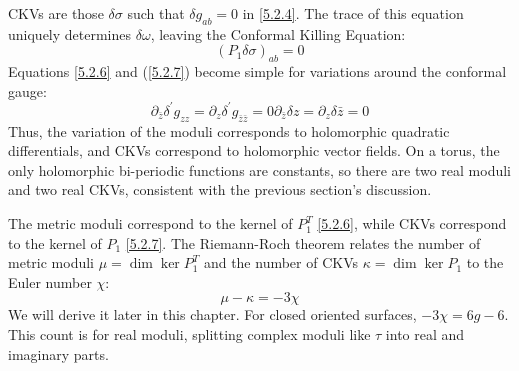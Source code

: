 CKVs are those $\delta \sigma$ such that $\delta g_{a b}=0$ in \eqref{5.2.4}. The trace of this equation uniquely determines $\delta \omega$, leaving the Conformal Killing Equation:
\begin{equation}
	\left(P_{1} \delta \sigma\right)_{a b}=0\label{5.2.7}
\end{equation}
Equations \eqref{5.2.6} and (\ref{5.2.7}) become simple for variations around the conformal gauge:
\begin{subequations}
	\begin{equation}
		\partial_{\bar{z}} \delta^{\prime} g_{z z} =\partial_{z} \delta^{\prime} g_{\bar{z} \bar{z}}=0 
	\end{equation}	
	\begin{equation}
		\partial_{\bar{z}} \delta z =\partial_{z} \delta \bar{z}=0
	\end{equation}			\label{5.2.8}
\end{subequations}
Thus, the variation of the moduli corresponds to holomorphic quadratic differentials, and CKVs correspond to holomorphic vector fields. On a torus, the only holomorphic bi-periodic functions are constants, so there are two real moduli and two real CKVs, consistent with the previous section's discussion.

The metric moduli correspond to the kernel of $P_{1}^{T}$ \eqref{5.2.6}, while CKVs correspond to the kernel of $P_{1}$ \eqref{5.2.7}. The Riemann-Roch theorem relates the number of metric moduli $\mu=\operatorname{dim} \operatorname{ker} P_{1}^{T}$ and the number of CKVs $\kappa=\operatorname{dim} \operatorname{ker} P_{1}$ to the Euler number $\chi$:
\begin{equation}
	\mu-\kappa=-3 \chi\label{5.2.9}
\end{equation}
We will derive it later in this chapter. For closed oriented surfaces, $-3 \chi=6 g-6$. This count is for real moduli, splitting complex moduli like $\tau$ into real and imaginary parts.

